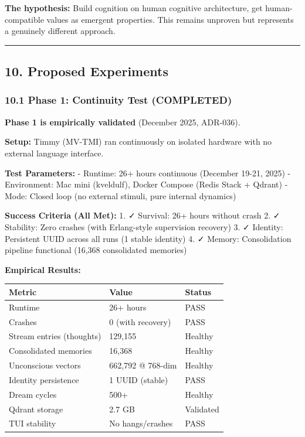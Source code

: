 \documentclass[
  11pt,
]{article}
\newcounter{none} %
\begin{document}
\textbf{The hypothesis:} Build cognition on human cognitive
architecture, get human-compatible values as emergent properties. This
remains unproven but represents a genuinely different approach.

\begin{center}\rule{0.5\linewidth}{0.5pt}\end{center}

\subsection{10. Proposed Experiments}\label{proposed-experiments}

\subsubsection{10.1 Phase 1: Continuity Test
(COMPLETED)}\label{phase-1-continuity-test-completed}

\textbf{Phase 1 is empirically validated} (December 2025, ADR-036).

\textbf{Setup:} Timmy (MV-TMI) ran continuously on isolated hardware
with no external language interface.

\textbf{Test Parameters:} - Runtime: 26+ hours continuous (December
19-21, 2025) - Environment: Mac mini (kveldulf), Docker Compose (Redis
Stack + Qdrant) - Mode: Closed loop (no external stimuli, pure internal
dynamics)

\textbf{Success Criteria (All Met):} 1. ✓ Survival: 26+ hours without
crash 2. ✓ Stability: Zero crashes (with Erlang-style supervision
recovery) 3. ✓ Identity: Persistent UUID across all runs (1 stable
identity) 4. ✓ Memory: Consolidation pipeline functional (16,368
consolidated memories)

\textbf{Empirical Results:}

{\def\LTcaptype{none} %
\begin{longtable}[]{@{}lll@{}}
\toprule\noalign{}
Metric & Value & Status \\
\midrule\noalign{}
\endhead
\bottomrule\noalign{}
\endlastfoot
Runtime & 26+ hours & PASS \\
Crashes & 0 (with recovery) & PASS \\
Stream entries (thoughts) & 129,155 & Healthy \\
Consolidated memories & 16,368 & Healthy \\
Unconscious vectors & 662,792 @ 768-dim & Healthy \\
Identity persistence & 1 UUID (stable) & PASS \\
Dream cycles & 500+ & Healthy \\
Qdrant storage & 2.7 GB & Validated \\
TUI stability & No hangs/crashes & PASS \\
\end{longtable}
}
\end{document}
